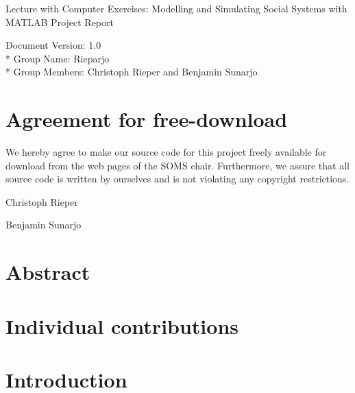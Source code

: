 \documentclass[a4paper, DIV11, abstracton]{scrartcl}
\begin{document}
\thispagestyle{empty}




Lecture with Computer Exercises: Modelling and Simulating Social Systems with MATLAB
Project Report

Document Version: 1.0\\*
Group Name: Rieparjo\\*
Group Members: Christoph Rieper and Benjamin Sunarjo



\newpage
\setcounter{page}{1}
\section*{Agreement for free-download}

We hereby agree to make our source code for this project freely available for download from the web pages of the SOMS chair. Furthermore, we assure that all source code is written by ourselves and is not violating any copyright restrictions.

\bigskip
Christoph Rieper

\bigskip
Benjamin Sunarjo

\newpage


\tableofcontents

\newpage
\setcounter{page}{1}	%
\pagestyle{plain}
\section*{Abstract}

\section*{Individual contributions}


\section{Introduction}
\end{document}
